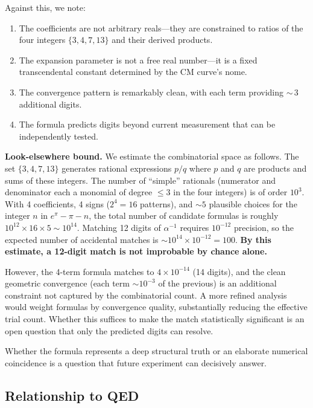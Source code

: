 \documentclass[11pt,twoside]{article}
\theoremstyle{remark}
\newcommand{\inv}{\alpha^{-1}}
\begin{document}
\noindent Against this, we note:
\begin{enumerate}[nosep]
    \item The coefficients are not arbitrary reals---they are constrained to ratios of the four integers $\{3, 4, 7, 13\}$ and their derived products.
    \item The expansion parameter is not a free real number---it is a fixed transcendental constant determined by the CM curve's nome.
    \item The convergence pattern is remarkably clean, with each term providing ${\sim}\,3$ additional digits.
    \item The formula predicts digits beyond current measurement that can be independently tested.
\end{enumerate}

\noindent\textbf{Look-elsewhere bound.}
We estimate the combinatorial space as follows. The set $\{3, 4, 7, 13\}$ generates rational expressions $p/q$ where $p$ and $q$ are products and sums of these integers. The number of ``simple'' rationals (numerator and denominator each a monomial of degree $\leq 3$ in the four integers) is of order $10^3$. With 4 coefficients, 4 signs ($2^4 = 16$ patterns), and $\sim 5$ plausible choices for the integer $n$ in $e^{\pi} - \pi - n$, the total number of candidate formulas is roughly $10^{12} \times 16 \times 5 \sim 10^{14}$. Matching 12 digits of $\inv$ requires $10^{-12}$ precision, so the expected number of accidental matches is $\sim 10^{14} \times 10^{-12} = 100$. \textbf{By this estimate, a 12-digit match is not improbable by chance alone.}

However, the 4-term formula matches to $4 \times 10^{-14}$ (14 digits), and the clean geometric convergence (each term $\sim 10^{-3}$ of the previous) is an additional constraint not captured by the combinatorial count. A more refined analysis would weight formulas by convergence quality, substantially reducing the effective trial count. Whether this suffices to make the match statistically significant is an open question that only the predicted digits can resolve.

Whether the formula represents a deep structural truth or an elaborate numerical coincidence is a question that future experiment can decisively answer.


\subsection{Relationship to QED}
\label{sec:qed}
\end{document}
